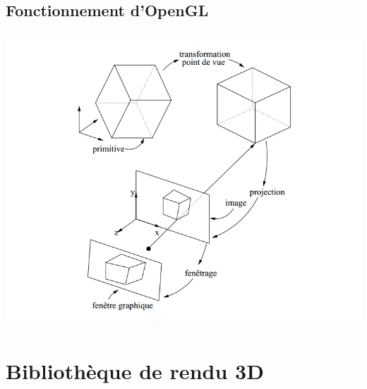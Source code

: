 \documentclass{report}
\begin{document}
\section{Fonctionnement d'OpenGL}
\begin{center}
	 \includegraphics[height=11cm]{img/Fonctionnement}
 \end{center}



\newpage

\chapter{Bibliothèque de rendu 3D}


\newpage
\end{document}
